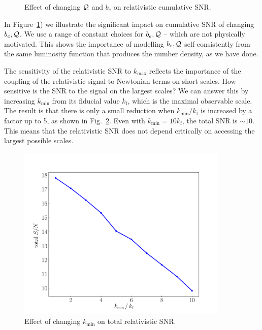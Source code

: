 \begin{itemize}
\begin{figure}[!ht]
\caption{Effect of changing ${\cal Q}$ and $b_e$ on relativistic cumulative SNR.} \label{fig1x}
\end{figure}
In Figure~\ref{fig1x}) we illustrate the significant impact on cumulative SNR of changing $b_e,\mathcal{Q}$. We use a range of constant choices for $b_e,\mathcal{Q}$ -- which are not physically motivated. This shows the importance of modelling $b_e,\mathcal{Q}$ self-consistently from the same  luminosity function that produces the number density, as we have done. 
\end{itemize}

{The sensitivity of the relativistic SNR to  $k_{\mathrm{max}}$ reflects the importance of the coupling of the relativistic signal to Newtonian terms on short scales. How sensitive is the SNR to the signal on the largest scales? We can answer this by increasing $k_{\mathrm{min}}$ from its fiducial value $k_{\mathrm{f}}$, which is the maximal observable scale. The result is that there is only a small reduction when $k_{\mathrm{min}}/k_{\mathrm{f}}$ is increased by a factor up to 5, as shown in Fig.~\ref{kmin}. 
{Even with $k_{\mathrm{min}}=10 k_{\mathrm{f}}$, the total SNR is $\sim 10$.} 
This means that the relativistic SNR does not depend critically on accessing the largest possible scales.}
\begin{figure}[!ht]
\centering
\includegraphics[width=0.9\textwidth]{fig/cumDoppSnr_kmin-eps-converted-to}
\caption{{Effect of changing $k_{\mathrm{min}}$ on  total relativistic SNR.} 
} \label{kmin}
\end{figure} 

